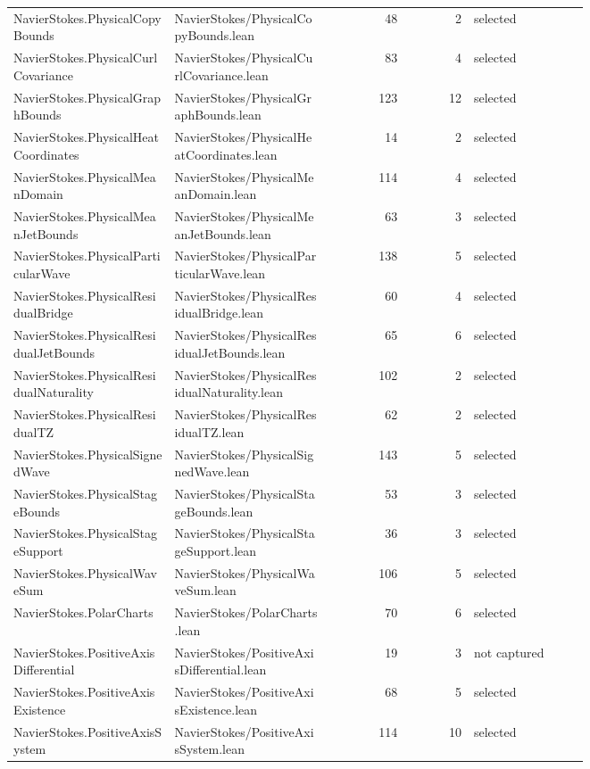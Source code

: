 \documentclass[10pt]{article}
\begin{document}
\begin{longtable}{p{0.28\linewidth}p{0.27\linewidth}r r p{0.20\linewidth}}
NavierStokes.PhysicalCopyBounds & NavierStokes/PhysicalCopyBounds.lean & 48 & 2 & selected\\
NavierStokes.PhysicalCurlCovariance & NavierStokes/PhysicalCurlCovariance.lean & 83 & 4 & selected\\
NavierStokes.PhysicalGraphBounds & NavierStokes/PhysicalGraphBounds.lean & 123 & 12 & selected\\
NavierStokes.PhysicalHeatCoordinates & NavierStokes/PhysicalHeatCoordinates.lean & 14 & 2 & selected\\
NavierStokes.PhysicalMeanDomain & NavierStokes/PhysicalMeanDomain.lean & 114 & 4 & selected\\
NavierStokes.PhysicalMeanJetBounds & NavierStokes/PhysicalMeanJetBounds.lean & 63 & 3 & selected\\
NavierStokes.PhysicalParticularWave & NavierStokes/PhysicalParticularWave.lean & 138 & 5 & selected\\
NavierStokes.PhysicalResidualBridge & NavierStokes/PhysicalResidualBridge.lean & 60 & 4 & selected\\
NavierStokes.PhysicalResidualJetBounds & NavierStokes/PhysicalResidualJetBounds.lean & 65 & 6 & selected\\
NavierStokes.PhysicalResidualNaturality & NavierStokes/PhysicalResidualNaturality.lean & 102 & 2 & selected\\
NavierStokes.PhysicalResidualTZ & NavierStokes/PhysicalResidualTZ.lean & 62 & 2 & selected\\
NavierStokes.PhysicalSignedWave & NavierStokes/PhysicalSignedWave.lean & 143 & 5 & selected\\
NavierStokes.PhysicalStageBounds & NavierStokes/PhysicalStageBounds.lean & 53 & 3 & selected\\
NavierStokes.PhysicalStageSupport & NavierStokes/PhysicalStageSupport.lean & 36 & 3 & selected\\
NavierStokes.PhysicalWaveSum & NavierStokes/PhysicalWaveSum.lean & 106 & 5 & selected\\
NavierStokes.PolarCharts & NavierStokes/PolarCharts.lean & 70 & 6 & selected\\
NavierStokes.PositiveAxisDifferential & NavierStokes/PositiveAxisDifferential.lean & 19 & 3 & not captured\\
NavierStokes.PositiveAxisExistence & NavierStokes/PositiveAxisExistence.lean & 68 & 5 & selected\\
NavierStokes.PositiveAxisSystem & NavierStokes/PositiveAxisSystem.lean & 114 & 10 & selected\\

\end{longtable}
\end{document}
